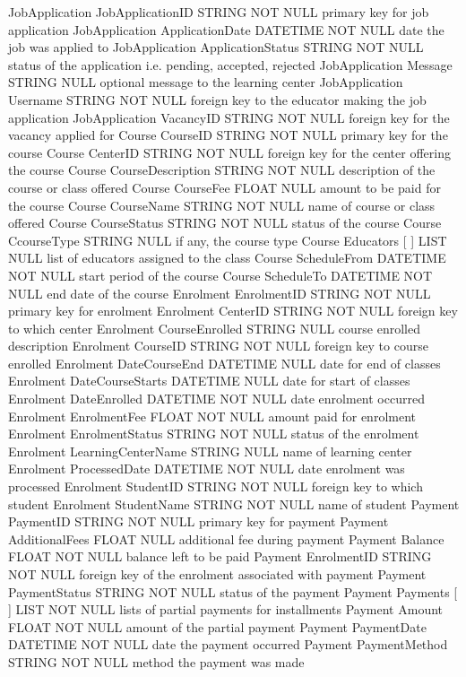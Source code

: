 JobApplication	JobApplicationID	STRING	NOT NULL	primary key for job application
JobApplication	ApplicationDate	DATETIME	NOT NULL	date the job was applied to
JobApplication	ApplicationStatus	STRING	NOT NULL	status of the application i.e. pending, accepted, rejected
JobApplication	Message	STRING	NULL	optional message to the learning center
JobApplication	Username	STRING	NOT NULL	foreign key to the educator making the job application
JobApplication	VacancyID	STRING	NOT NULL	foreign key for the vacancy applied for
Course	CourseID	STRING	NOT NULL	primary key for the course
Course	CenterID	STRING	NOT NULL	foreign key for the center offering the course
Course	CourseDescription	STRING	NOT NULL	description of the course or class offered
Course	CourseFee	FLOAT	NULL	amount to be paid for the course
Course	CourseName	STRING	NOT NULL	name of course or class offered
Course	CourseStatus	STRING	NOT NULL	status of the course
Course	CcourseType	STRING	NULL	if any, the course type
Course	Educators [ ]	LIST	NULL	list of educators assigned to the class
Course	ScheduleFrom	DATETIME	NOT NULL	start period of the course
Course	ScheduleTo	DATETIME	NOT NULL	end date of the course
Enrolment	EnrolmentID	STRING	NOT NULL	primary key for enrolment
Enrolment	CenterID	STRING	NOT NULL	foreign key to which center
Enrolment	CourseEnrolled	STRING	NULL	course enrolled description
Enrolment	CourseID	STRING	NOT NULL	foreign key to course enrolled
Enrolment	DateCourseEnd	DATETIME	NULL	date for end of classes
Enrolment	DateCourseStarts	DATETIME	NULL	date for start of classes
Enrolment	DateEnrolled	DATETIME	NOT NULL	date enrolment occurred
Enrolment	EnrolmentFee	FLOAT	NOT NULL	amount paid for enrolment
Enrolment	EnrolmentStatus	STRING	NOT NULL	status of the enrolment
Enrolment	LearningCenterName	STRING	NULL	name of learning center
Enrolment	ProcessedDate	DATETIME	NOT NULL	date enrolment was processed
Enrolment	StudentID	STRING	NOT NULL	foreign key to which student
Enrolment	StudentName	STRING	NOT NULL	name of student
Payment	PaymentID	STRING	NOT NULL	primary key for payment
Payment	AdditionalFees	FLOAT	NULL	additional fee during payment
Payment	Balance	FLOAT	NOT NULL	balance left to be paid
Payment	EnrolmentID	STRING	NOT NULL	foreign key of the enrolment associated with payment
Payment	PaymentStatus	STRING	NOT NULL	status of the payment
Payment	Payments [ ] { }	LIST	NOT NULL	lists of partial payments for installments
Payment	 	Amount	FLOAT	NOT NULL	amount of the partial payment
Payment		PaymentDate	DATETIME	NOT NULL	date the payment occurred
Payment		PaymentMethod	STRING	NOT NULL	method the payment was made
